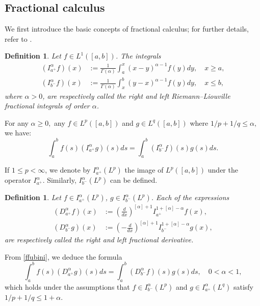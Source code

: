 \documentclass[preprint,12pt]{elsarticle}
\newtheorem{definition}[theorem]{Definition}
\theoremstyle{definition}  %
\theoremstyle{plain}  %
\begin{document}
\subsection{Fractional calculus}

We first introduce the basic concepts of fractional calculus; for further details, refer to \cite{Samko1993}.
 \begin{definition}
   	Let $f\in L^1([a,b])$. The integrals 
   	\begin{align*}
   		(I_{a^+}^\alpha f)(x)&:=\frac{1}{\Gamma(\alpha)}\int_a^x (x-y)^{\alpha-1}f(y)dy,\quad x\geq a,\\
   		(I_{b^-}^\alpha f)(x)&:=\frac{1}{\Gamma(\alpha)}\int_x^b (y-x)^{\alpha-1}f(y)dy,\quad x\leq b,
   	\end{align*}
   	where $\alpha>0$, are respectively called the right and left Riemann--Liouville fractional integrals of order $\alpha$.

   \end{definition}
   
   For any $\alpha\geq 0,$ any $f\in L^p([a,b])$ and $g\in L^q([a,b])$ where $1/p+1/q\leq \alpha,$ we have:
   \begin{equation}
   	\int_a^b f(s)(I_{a^+}^\alpha g)(s)ds=\int _a^b (I_{b^-}^\alpha f)(s) g(s) ds.\label{ffubini}
   \end{equation}
   
   	
   	If $1 \leq p < \infty$, we denote by $I_{a^+}^\alpha(L^p)$ the image of $L^p([a,b])$ under the operator $I_{a^+}^\alpha$. Similarly, $I_{b^-}^\alpha(L^p)$ can be defined.

   	
   	\begin{definition}
   		 Let $f\in I_{a^+}^\alpha(L^p) $, $g\in I_{b^-}^\alpha(L^p) $.
   		 Each of the expressions 
   		 \begin{align*}
   		(D_{a^+}^\alpha f)(x)&:=\left(\frac{d}{dx} \right)^{[\alpha]+1}I_{a^+}^{1+[\alpha]-\alpha}f(x),\\
   		(D_{b^-}^\alpha g)(x)&:=\left(-\frac{d}{dx} \right)^{[\alpha]+1}I_{b^-}^{1+[\alpha]-\alpha}g(x),
   	   	\end{align*}
   		 are respectively called the right and left fractional derivative.
   \end{definition}
  From \eqref{ffubini}, we deduce the formula  
\begin{equation}
  \int_a^b f(s)(D_{a^+}^\alpha g)(s)ds
  =\int _a^b (D_{b^-}^\alpha f)(s) g(s) ds,\quad 0<\alpha<1, \label{fffubini}
\end{equation}
which holds under the assumptions that \( f\in I^\alpha_{b^-}(L^p) \) and \( g\in I^\alpha_{a^+}(L^q) \) satisfy \( 1/p+1/q\leq 1+\alpha \).
   
\end{document}
